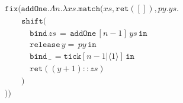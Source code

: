 $$
\begin{array}{l}
\texttt{fix}(\texttt{addOne}.\Lambda n.\lambda xs.\texttt{match}(xs,\texttt{ret}([]),py.ys.\\[-2mm]
  \hspace{2em} \texttt{shift}(\\[-2mm]
  \hspace{3em} \texttt{bind} \, zs \, = \, \texttt{addOne} \, [n-1] \, ys \, \texttt{in}\\[-2mm]
  \hspace{3em} \texttt{release} \, y = \, py \, \texttt{in} \\[-2mm]
  \hspace{3em} \texttt{bind} \, \_ \, =  \texttt{tick}[n-1|\langle 1 \rangle] \, \texttt{in}\\[-2mm]
  \hspace{3em} \texttt{ret}((y+1)::zs)\\[-2mm]
  \hspace{2em})\\[-2mm]
))
\end{array}
$$